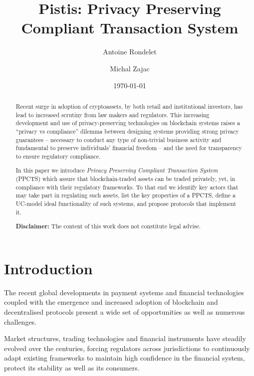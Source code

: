 \documentclass[runningheads,10pt]{llncs}
\title{{\textsf{Pistis}}: Privacy Preserving Compliant Transaction System}
\author{Antoine Rondelet \and Michal Zajac}
\institute{Clearmatics, UK \\
\email{ar@clearmatics.com}, \email{michal.zajac@clearmatics.com}}
\date{\today}
\numberwithin{equation}{section}
\begin{document}
\maketitle

\begin{abstract}
  Recent surge in adoption of cryptoassets, by both retail and institutional
  investors, has lead to increased scrutiny from law makers and regulators.
  This increasing development and use of privacy-preserving technologies on
  blockchain systems raises a ``privacy vs compliance'' dilemma between
  designing systems providing strong privacy guarantees -- necessary to conduct
  any type of non-trivial business activity and fundamental to preserve
  individuals' financial freedom -- and the need for transparency to ensure
  regulatory compliance.

  In this paper we introduce \emph{Privacy Preserving Compliant Transaction
    System} (PPCTS) which assure that blockchain-traded assets can be traded
  privately, yet, in compliance with their regulatory frameworks. To that end we
  identify key actors that may take part in regulating such assets, list the key
  properties of a PPCTS, define a UC-model ideal functionality of such systems,
  and propose protocols that implement it.


\vspace*{1em}

\textbf{Disclaimer:} The content of this work does not constitute legal advise.
\end{abstract}

\section{Introduction}\label{sec:intro}

The recent global developments in payment systems and financial technologies
coupled with the emergence and increased adoption of blockchain and
decentralised protocols present a wide set of opportunities as well as numerous
challenges.

Market structures, trading technologies and financial instruments have steadily
evolved over the centuries, forcing regulators across jurisdictions to 
continuously adapt existing frameworks to maintain high confidence in the 
financial system, protect its stability as well as its consumers.
\end{document}
